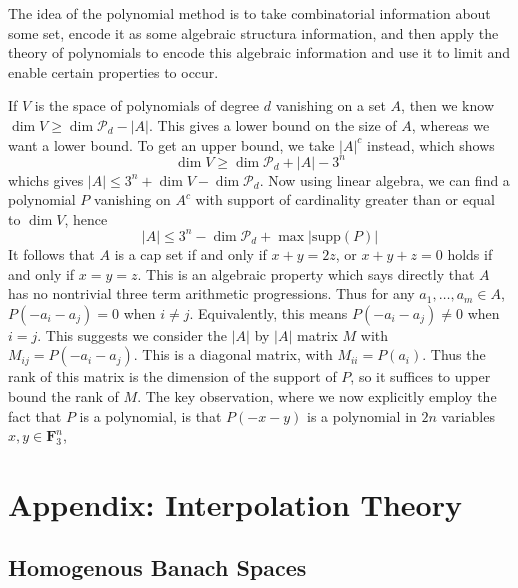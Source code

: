 The idea of the polynomial method is to take combinatorial information about some set, encode it as some algebraic structura information, and then apply the theory of polynomials to encode this algebraic information and use it to limit and enable certain properties to occur.

If $V$ is the space of polynomials of degree $d$ vanishing on a set $A$, then we know $\dim V \geq \dim \mathcal{P}_d - |A|$. This gives a lower bound on the size of $A$, whereas we want a lower bound. To get an upper bound, we take $|A|^c$ instead, which shows
%
\[ \dim V \geq \dim \mathcal{P}_d + |A| - 3^n \]
%
whichs gives $|A| \leq 3^n + \dim V - \dim \mathcal{P}_d$. Now using linear algebra, we can find a polynomial $P$ vanishing on $A^c$ with support of cardinality greater than or equal to $\dim V$, hence
%
\[ |A| \leq 3^n - \dim \mathcal{P}_d + \max |\text{supp}(P)| \]
%
It follows that $A$ is a cap set if and only if $x + y = 2z$, or $x + y + z = 0$ holds if and only if $x = y = z$. This is an algebraic property which says directly that $A$ has no nontrivial three term arithmetic progressions. Thus for any $a_1, \dots, a_m \in A$, $P(-a_i-a_j) = 0$ when $i \neq j$. Equivalently, this means $P(-a_i-a_j) \neq 0$ when $i = j$. This suggests we consider the $|A|$ by $|A|$ matrix $M$ with $M_{ij} = P(-a_i-a_j)$. This is a diagonal matrix, with $M_{ii} = P(a_i)$. Thus the rank of this matrix is the dimension of the support of $P$, so it suffices to upper bound the rank of $M$. The key observation, where we now explicitly employ the fact that $P$ is a polynomial, is that $P(-x-y)$ is a polynomial in $2n$ variables $x,y \in \mathbf{F}_3^n$,









\chapter{Appendix: Interpolation Theory}




















\section{Homogenous Banach Spaces}

